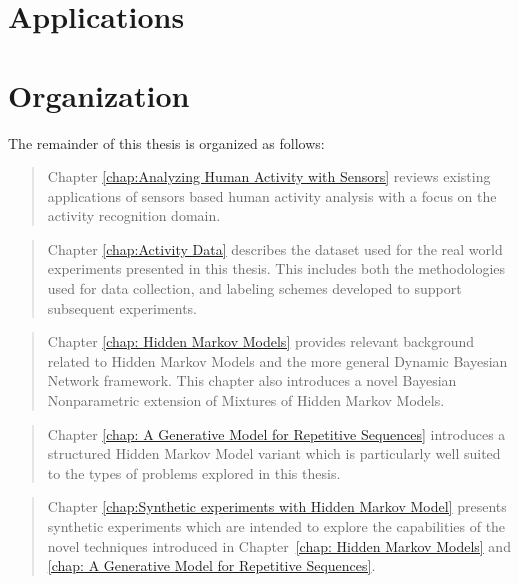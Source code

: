 \documentclass[12pt]{report}
\newcommand{\1}[0]{\mathbbm{1}}
\begin{document}
\section{Applications}

\section{Organization}
The remainder of this thesis is organized as follows:
\begin{quote}
    Chapter \ref{chap:Analyzing Human Activity with Sensors} reviews existing
    applications of sensors based human activity analysis with a focus on the
    activity recognition domain.
\end{quote}

\begin{quote}
    Chapter \ref{chap:Activity Data} describes the dataset used
    for the real world experiments presented in this thesis.
    This includes both the methodologies used for data collection,
    and labeling schemes developed to support subsequent experiments.
\end{quote}

\begin{quote}
    Chapter \ref{chap: Hidden Markov Models} provides relevant background
    related to Hidden Markov Models and the more general Dynamic Bayesian Network
    framework. This chapter also introduces a novel Bayesian Nonparametric extension
    of Mixtures of Hidden Markov Models.
\end{quote}

\begin{quote}
    Chapter \ref{chap: A Generative Model for Repetitive Sequences} introduces
    a structured Hidden Markov Model variant which is particularly well suited
    to the types of problems explored in this thesis.
\end{quote}

\begin{quote}
    Chapter \ref{chap:Synthetic experiments with Hidden Markov Model} presents
    synthetic experiments which are intended to explore the capabilities of the
    novel techniques introduced in Chapter~\ref{chap: Hidden Markov Models} and
    \ref{chap: A Generative Model for Repetitive Sequences}.
\end{quote}
\end{document}
